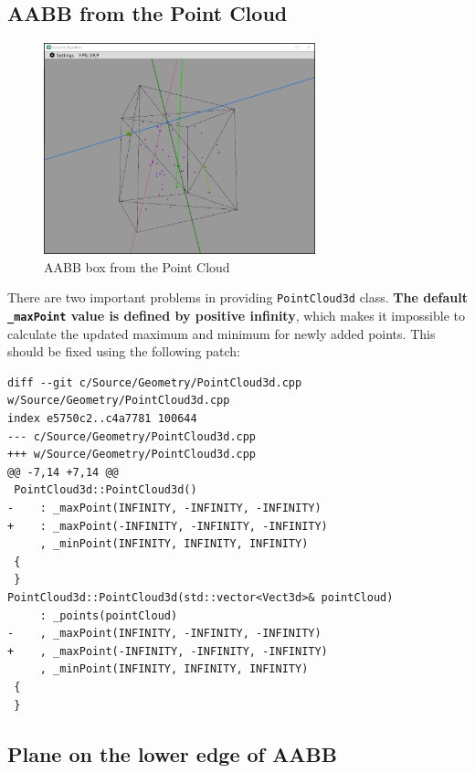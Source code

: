 \documentclass[12pt,a4paper,english]{article}
\begin{document}
\subsection{AABB from the Point Cloud}

\begin{figure}[H]
    \centering
    \includegraphics[width=0.7\textwidth]{p2a-5}
    \caption[]{AABB box from the Point Cloud}
    \label{fig:p2a-5}
\end{figure}

There are two important problems in providing \lstinline{PointCloud3d} class. \textbf{The default \lstinline{_maxPoint} value is defined by positive infinity}, which makes it impossible to calculate the updated maximum and minimum for newly added points. This should be fixed using the following patch:

\begin{verbatim}
diff --git c/Source/Geometry/PointCloud3d.cpp w/Source/Geometry/PointCloud3d.cpp
index e5750c2..c4a7781 100644
--- c/Source/Geometry/PointCloud3d.cpp
+++ w/Source/Geometry/PointCloud3d.cpp
@@ -7,14 +7,14 @@
 PointCloud3d::PointCloud3d()
-    : _maxPoint(INFINITY, -INFINITY, -INFINITY)
+    : _maxPoint(-INFINITY, -INFINITY, -INFINITY)
     , _minPoint(INFINITY, INFINITY, INFINITY)
 {
 }
PointCloud3d::PointCloud3d(std::vector<Vect3d>& pointCloud)
     : _points(pointCloud)
-    , _maxPoint(INFINITY, -INFINITY, -INFINITY)
+    , _maxPoint(-INFINITY, -INFINITY, -INFINITY)
     , _minPoint(INFINITY, INFINITY, INFINITY)
 {
 }
\end{verbatim}

\subsection{Plane on the lower edge of AABB}
\end{document}
